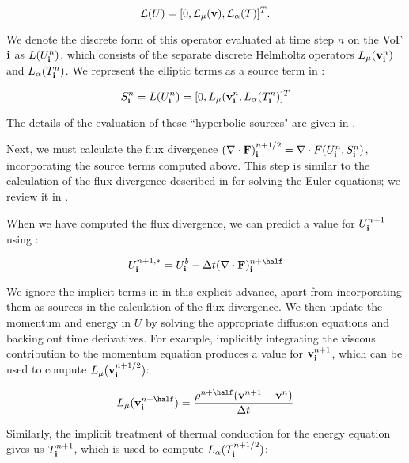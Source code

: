 \begin{equation}
\mathcal{L}(U) = [0, \mathcal{L}_\mu(\mathbf{v}), \mathcal{L}_\alpha(T)]^T. \label{eq:LU}
\end{equation}

\noindent
We denote the discrete form of this operator evaluated at time step $n$ on the 
VoF ${\bf i}$ as $L(U^n_{\bf i})$, which consists of the separate discrete Helmholtz 
operators $L_\mu(\mathbf{v}^n_{\bf i})$ and $L_\alpha(T^n_{\bf i})$. We represent the 
elliptic terms as a source term in :

\begin{equation}
S^n_{\bf i} = L(U^n_{\bf i}) = [0, L_\mu(\mathbf{v}^n_{\bf i}, L_\alpha(T^n_{\bf i})]^T \label{eq:hyperbolicSources}
\end{equation}

The details of the evaluation of these ``hyperbolic sources" are given in 
.

Next, we must calculate the flux divergence 
$(\nabla\cdot{\mathbf{F}})^{n+1/2}_{\bf i} = \nabla\cdot{F}(U^n_{\bf i}, S^n_{\bf i})$,
incorporating the source terms computed above. This step is similar to the 
calculation of the flux divergence described in \cite{???} for solving the 
Euler equations; we review it in . 

When we have computed the flux divergence, we can predict a value for 
$U^{n+1}_{\bf i}$ using :

\begin{equation}
U^{n+1,*}_\ib = U^b_\ib - \dt(\diverg{\vec{F}})^{n+\half}_\ib
\end{equation}

\noindent
We ignore the implicit terms in  in this explicit 
advance, apart from incorporating them as sources in the calculation of the 
flux divergence. We then update the momentum and energy in $U$ by solving the 
appropriate diffusion equations and backing out time derivatives. For example, 
implicitly integrating the viscous contribution to the momentum equation 
produces a value for $\mathbf{v}^{n+1}_{\bf i}$, which can be used to compute 
$L_\mu(\mathbf{v}^{n+1/2}_{\bf i})$:

\begin{equation}
L_\mu(\vec{v}^{n+\half}_\ib) = \frac{\rho^{n+\half}(\vec{v}^{n+1} - \vec{v}^n)}{\dt}
\end{equation}

\noindent
Similarly, the implicit treatment of thermal conduction for the energy equation
gives us $T^{n+1}_{\bf i}$, which is used to compute $L_\alpha(T^{n+1/2}_{\bf i})$:

